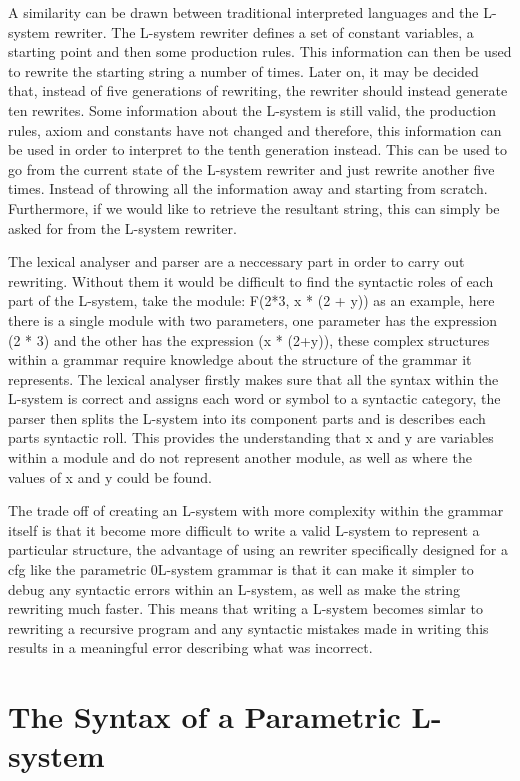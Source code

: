 A similarity can be drawn between traditional interpreted languages and the L-system rewriter. The L-system rewriter defines a set of constant variables, a starting point and then some production rules. This information can then be used to rewrite the starting string a number of times. Later on, it may be decided that, instead of five generations of rewriting, the rewriter should instead generate ten rewrites. Some information about the L-system is still valid, the production rules, axiom and constants have not changed and therefore, this information can be used in order to interpret to the tenth generation instead. This can be used to go from the current state of the L-system rewriter and just rewrite another five times. Instead of throwing all the information away and starting from scratch. Furthermore, if we would like to retrieve the resultant string, this can simply be asked for from the L-system rewriter. 

The lexical analyser and parser are a neccessary part in order to carry out rewriting. Without them it would be difficult to find the syntactic roles of each part of the L-system, take the module: F(2*3, x * (2 + y)) as an example, here there is a single module with two parameters, one parameter has the expression (2 * 3) and the other has the expression (x * (2+y)), these complex structures within a grammar require knowledge about the structure of the grammar it represents. The lexical analyser firstly makes sure that all the syntax within the L-system is correct and assigns each word or symbol to a syntactic category, the parser then splits the L-system into its component parts and is describes each parts syntactic roll. This provides the understanding that x and y are variables within a module and do not represent another module, as well as where the values of x and y could be found. 

The trade off of creating an L-system with more complexity within the grammar itself is that it become more difficult to write a valid L-system to represent a particular structure, the advantage of using an rewriter specifically designed for a \acrshort{cfg} like the parametric 0L-system grammar is that it can make it simpler to debug any syntactic errors within an L-system, as well as make the string rewriting much faster. This means that writing a L-system becomes simlar to rewriting a recursive program and any syntactic mistakes made in writing this  results in a meaningful error describing what was incorrect. 

\section{The Syntax of a Parametric L-system}

